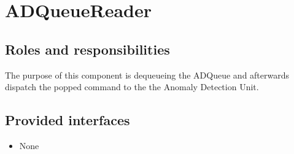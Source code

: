 \section{ADQueueReader}
\label{element:ad-queue-reader}

\subsection{Roles and responsibilities}

\npar The purpose of this component is dequeueing the ADQueue and
afterwards dispatch the popped command to the the Anomaly Detection Unit.

\subsection{Provided interfaces}

\begin{itemize}
  \item None
\end{itemize}
